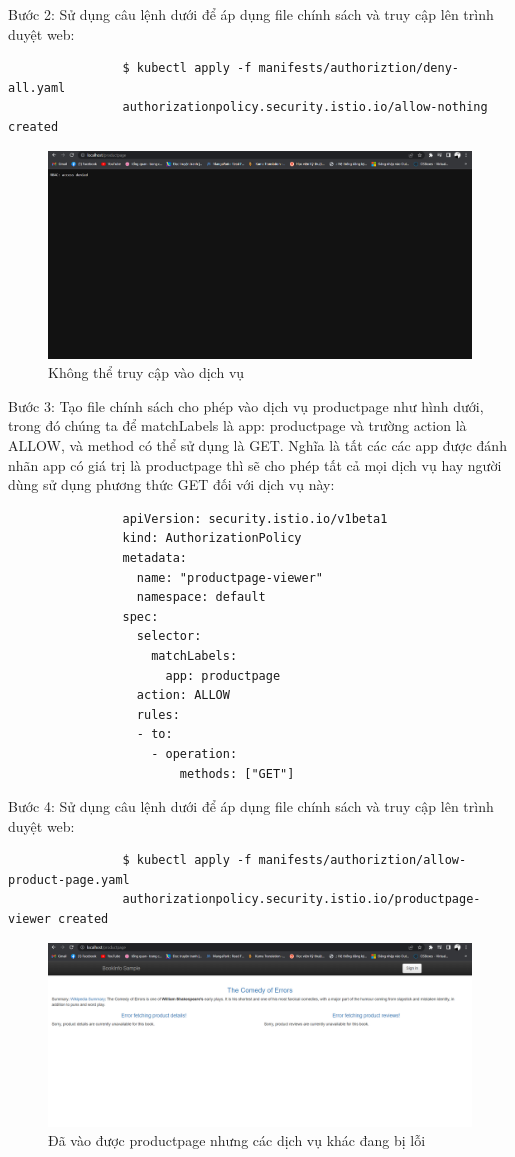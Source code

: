 \documentclass[12pt,a4paper]{report}
\begin{document}
{{				Bước 2: Sử dụng câu lệnh dưới để áp dụng file chính sách và truy cập lên trình duyệt web:
				\begin{lstlisting}
				$ kubectl apply -f manifests/authoriztion/deny-all.yaml 
				authorizationpolicy.security.istio.io/allow-nothing created
				\end{lstlisting}
				\begin{figure}[h]
					\centering
					\includegraphics[width=1\linewidth]{Pics/3.3.2-p1}
					\caption{Không thể truy cập vào dịch vụ}
					\label{fig:3}
				\end{figure}
			
				Bước 3: Tạo file chính sách cho phép vào dịch vụ productpage như hình dưới, trong đó chúng ta để matchLabels là app: productpage và trường action là ALLOW, và method có thể sử dụng là GET. Nghĩa là tất các các app được đánh nhãn app có giá trị là productpage thì sẽ cho phép tất cả mọi dịch vụ hay người dùng sử dụng phương thức GET đối với dịch vụ này:
				\begin{lstlisting}
				apiVersion: security.istio.io/v1beta1
				kind: AuthorizationPolicy
				metadata:
				  name: "productpage-viewer"
				  namespace: default
				spec:
				  selector:
				    matchLabels:
				      app: productpage
				  action: ALLOW
				  rules:
				  - to:
				    - operation:
				        methods: ["GET"]
				\end{lstlisting}
				
				Bước 4: Sử dụng câu lệnh dưới để áp dụng file chính sách và truy cập lên trình duyệt web:
				\begin{lstlisting}
				$ kubectl apply -f manifests/authoriztion/allow-product-page.yaml 
				authorizationpolicy.security.istio.io/productpage-viewer created
				\end{lstlisting}
				\begin{figure}[h]
					\centering
					\includegraphics[width=0.7\linewidth]{Pics/3.3.2-p2}
					\caption{Đã vào được productpage nhưng các dịch vụ khác đang bị lỗi}
					\label{fig:3}
				\end{figure}
				
}}
\end{document}
